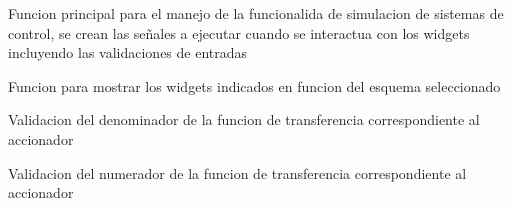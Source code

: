 \documentclass[letterpaper,10pt,spanish]{sphinxmanual}
\begin{document}

\begin{fulllineitems}
\label{\detokenize{codigos/simulacionHandler:simulacionHandler.SimulacionHandler}}
Funcion principal para el manejo de la funcionalida de simulacion de sistemas de control, se crean las señales a ejecutar cuando se interactua con los widgets incluyendo las validaciones de entradas

\end{fulllineitems}


\begin{fulllineitems}
\label{\detokenize{codigos/simulacionHandler:simulacionHandler.accion_esquema_selector}}
Funcion para mostrar los widgets indicados en funcion del esquema seleccionado

\end{fulllineitems}


\begin{fulllineitems}
\label{\detokenize{codigos/simulacionHandler:simulacionHandler.accionadordem_validator}}
Validacion del denominador de la funcion de transferencia correspondiente al accionador

\end{fulllineitems}


\begin{fulllineitems}
\label{\detokenize{codigos/simulacionHandler:simulacionHandler.accionadornum_validator}}
Validacion del numerador de la funcion de transferencia correspondiente al accionador

\end{fulllineitems}
\end{document}
